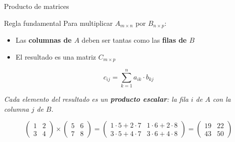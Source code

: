 \documentclass[aspectratio=169,10pt]{beamer}
\begin{document}
\begin{frame}{Producto de matrices}

\begin{block}{Regla fundamental}
Para multiplicar $A_{m \times n}$ por $B_{n \times p}$:
\begin{itemize}
    \item Las \textbf{columnas de $A$} deben ser tantas como las \textbf{filas de $B$}
    \item El resultado es una matriz $C_{m \times p}$
\end{itemize}
$$c_{ij} = \sum_{k=1}^{n} a_{ik} \cdot b_{kj}$$
\end{block}

\vspace{0.2cm}
\begin{center}
\textit{Cada elemento del resultado es un \textbf{producto escalar}: la fila $i$ de $A$ con la columna $j$ de $B$.}
\end{center}

\vspace{0.3cm}
$$\begin{pmatrix} 1 & 2 \\ 3 & 4 \end{pmatrix} \times
\begin{pmatrix} 5 & 6 \\ 7 & 8 \end{pmatrix} =
\begin{pmatrix} 1{\cdot}5 + 2{\cdot}7 & 1{\cdot}6 + 2{\cdot}8 \\
3{\cdot}5 + 4{\cdot}7 & 3{\cdot}6 + 4{\cdot}8 \end{pmatrix} =
\begin{pmatrix} 19 & 22 \\ 43 & 50 \end{pmatrix}$$
\end{frame}
\end{document}
